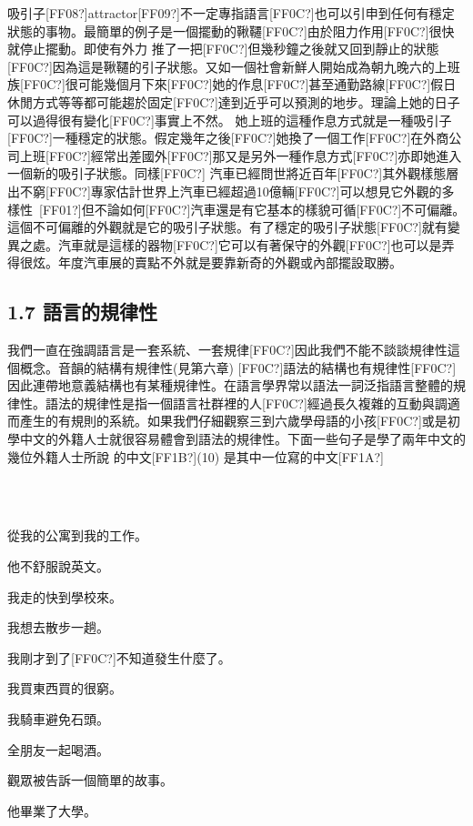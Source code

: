 吸引子[FF08?]attractor[FF09?]不一定專指語言[FF0C?]也可以引申到任何有穩定狀態的事物。最簡單的例子是一個擺動的鞦韆[FF0C?]由於阻力作用[FF0C?]很快就停止擺動。即使有外力 推了一把[FF0C?]但幾秒鐘之後就又回到靜止的狀態[FF0C?]因為這是鞦韆的引子狀態。又如一個社會新鮮人開始成為朝九晚六的上班族[FF0C?]很可能幾個月下來[FF0C?]她的作息[FF0C?]甚至通勤路線[FF0C?]假日休閒方式等等都可能趨於固定[FF0C?]達到近乎可以預測的地步。理論上她的日子可以過得很有變化[FF0C?]事實上不然。 她上班的這種作息方式就是一種吸引子[FF0C?]一種穩定的狀態。假定幾年之後[FF0C?]她換了一個工作[FF0C?]在外商公司上班[FF0C?]經常出差國外[FF0C?]那又是另外一種作息方式[FF0C?]亦即她進入一個新的吸引子狀態。同樣[FF0C?] 汽車已經問世將近百年[FF0C?]其外觀樣態層出不窮[FF0C?]專家估計世界上汽車已經超過10億輛[FF0C?]可以想見它外觀的多樣性~[FF01?]但不論如何[FF0C?]汽車還是有它基本的樣貌可循[FF0C?]不可偏離。這個不可偏離的外觀就是它的吸引子狀態。有了穩定的吸引子狀態[FF0C?]就有變異之處。汽車就是這樣的器物[FF0C?]它可以有著保守的外觀[FF0C?]也可以是弄得很炫。年度汽車展的賣點不外就是要靠新奇的外觀或內部擺設取勝。   

\subsection{1.7 語言的規律性} 

我們一直在強調語言是一套系統、一套規律[FF0C?]因此我們不能不談談規律性這個概念。音韻的結構有規律性(見第六章) [FF0C?]語法的結構也有規律性[FF0C?]因此連帶地意義結構也有某種規律性。在語言學界常以語法一詞泛指語言整體的規律性。語法的規律性是指一個語言社群裡的人[FF0C?]經過長久複雜的互動與調適而產生的有規則的系統。如果我們仔細觀察三到六歲學母語的小孩[FF0C?]或是初學中文的外籍人士就很容易體會到語法的規律性。下面一些句子是學了兩年中文的幾位外籍人士所說 的中文[FF1B?](10) 是其中一位寫的中文[FF1A?] 

\ea%
\label{ex:key:9}
\gll\\
\\
\glt
\z

從我的公寓到我的工作。

他不舒服說英文。

我走的快到學校來。

我想去散步一趟。

我剛才到了[FF0C?]不知道發生什麼了。

我買東西買的很窮。

我騎車避免石頭。

全朋友一起喝酒。

觀眾被告訴一個簡單的故事。

他畢業了大學。

